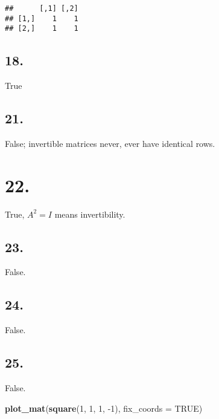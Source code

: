 \documentclass[]{article}
\newenvironment{Shaded}{\begin{snugshade}}{\end{snugshade}}
\newcommand{\DataTypeTok}[1]{\textcolor[rgb]{0.00,0.34,0.68}{#1}}
\newcommand{\DecValTok}[1]{\textcolor[rgb]{0.69,0.50,0.00}{#1}}
\newcommand{\KeywordTok}[1]{\textcolor[rgb]{0.12,0.11,0.11}{\textbf{#1}}}
\newcommand{\NormalTok}[1]{\textcolor[rgb]{0.12,0.11,0.11}{#1}}
\newcommand{\OtherTok}[1]{\textcolor[rgb]{0.00,0.43,0.16}{#1}}
\begin{document}
\begin{verbatim}
##      [,1] [,2]
## [1,]    1    1
## [2,]    1    1
\end{verbatim}

\hypertarget{section-132}{%
\subsection{18.}\label{section-132}}

True

\hypertarget{section-133}{%
\subsection{21.}\label{section-133}}

False; invertible matrices never, ever have identical rows.

\hypertarget{section-134}{%
\section{22.}\label{section-134}}

True, \(A^2=I\) means invertibility.

\hypertarget{section-135}{%
\subsection{23.}\label{section-135}}

False.

\hypertarget{section-136}{%
\subsection{24.}\label{section-136}}

False.

\hypertarget{section-137}{%
\subsection{25.}\label{section-137}}

False.

\begin{Shaded}
\begin{Highlighting}[]
\KeywordTok{plot_mat}\NormalTok{(}\KeywordTok{square}\NormalTok{(}\DecValTok{1}\NormalTok{, }\DecValTok{1}\NormalTok{, }\DecValTok{1}\NormalTok{, }\DecValTok{-1}\NormalTok{), }\DataTypeTok{fix_coords =} \OtherTok{TRUE}\NormalTok{)}
\end{Highlighting}
\end{Shaded}
\end{document}
